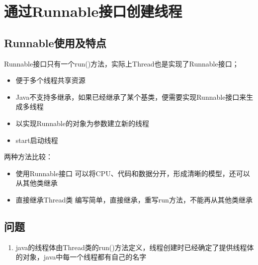 \section{通过Runnable接口创建线程}
\subsection{Runnable使用及特点}
Runnable接口只有一个run()方法，实际上Thread也是实现了Runnable接口；
\begin{itemize}
	\item 便于多个线程共享资源
	\item Java不支持多继承，如果已经继承了某个基类，便需要实现Runnable接口来生成多线程
	\item 以实现Runnable的对象为参数建立新的线程
	\item start启动线程
\end{itemize}
两种方法比较：
\begin{itemize}
	\item 使用Runnable接口
	\subitem 可以将CPU、代码和数据分开，形成清晰的模型，还可以从其他类继承
	\item 直接继承Thread类
	\subitem
	编写简单，直接继承，重写run方法，不能再从其他类继承
\end{itemize}
\subsection{问题}
\begin{enumerate}
	\item java的线程体由Thread类的run()方法定义，线程创建时已经确定了提供线程体的对象，java中每一个线程都有自己的名字
\end{enumerate}
